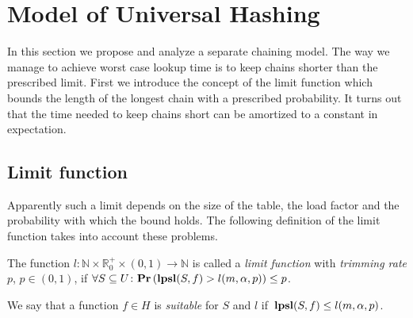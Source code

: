 \section{Model of Universal Hashing}
\label{section-model}
In this section we propose and analyze a separate chaining model. 
The way we manage to achieve worst case lookup time is to keep chains shorter than the prescribed limit. 
First we introduce the concept of the limit function which bounds the length of the longest chain with a prescribed probability. 
It turns out that the time needed to keep chains short can be amortized to a constant in expectation.

\subsection{Limit function}
Apparently such a limit depends on the size of the table, the load factor and the probability with which the bound holds. 
The following definition of the limit function takes into account these problems.

\begin{definition}
\label{definition-limit-function}
The function $l\colon \mathbb{N} \times \mathbb{R}_0^+ \times (0, 1) \rightarrow \mathbb{N}$ is called a \emph{limit function} with \emph{trimming rate} $p$, $p \in (0, 1)$, if $\forall S \subseteq U\colon \mathbf{Pr}\left(\mathbf{lpsl}(S, f) > l(m, \alpha, p)\right) \leq p$.

We say that a function $f \in H$ is \emph{suitable} for $S$ and $l$ if $\,\mathbf{lpsl}(S, f) \le l(m, \alpha, p)$.
\end{definition}

